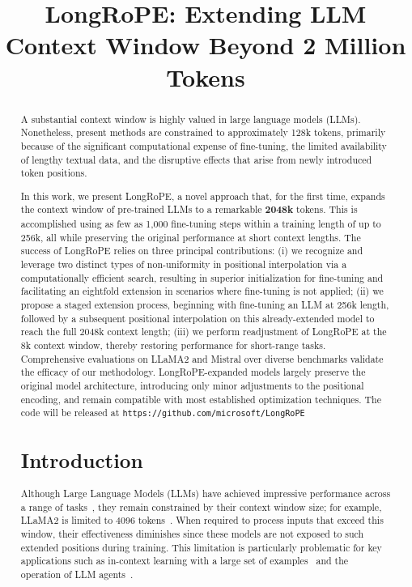 \title{LongRoPE: Extending LLM Context Window Beyond 2 Million Tokens}

\begin{abstract}
A substantial context window is highly valued in large language models (LLMs). Nonetheless, present methods are constrained to approximately 128k tokens, primarily because of the significant computational expense of fine-tuning, the limited availability of lengthy textual data, and the disruptive effects that arise from newly introduced token positions.

In this work, we present LongRoPE, a novel approach that, for the first time, expands the context window of pre-trained LLMs to a remarkable \textbf{2048k} tokens. This is accomplished using as few as 1,000 fine-tuning steps within a training length of up to 256k, all while preserving the original performance at short context lengths. The success of LongRoPE relies on three principal contributions: (i) we recognize and leverage two distinct types of non-uniformity in positional interpolation via a computationally efficient search, resulting in superior initialization for fine-tuning and facilitating an eightfold extension in scenarios where fine-tuning is not applied; (ii) we propose a staged extension process, beginning with fine-tuning an LLM at 256k length, followed by a subsequent positional interpolation on this already-extended model to reach the full 2048k context length; (iii) we perform readjustment of LongRoPE at the 8k context window, thereby restoring performance for short-range tasks. Comprehensive evaluations on LLaMA2 and Mistral over diverse benchmarks validate the efficacy of our methodology. LongRoPE-expanded models largely preserve the original model architecture, introducing only minor adjustments to the positional encoding, and remain compatible with most established optimization techniques. The code will be released at \texttt{https://github.com/microsoft/LongRoPE}

\section{Introduction}

Although Large Language Models (LLMs) have achieved impressive performance across a range of tasks~\cite{gpt4,llama2}, they remain constrained by their context window size; for example, LLaMA2 is limited to 4096 tokens~\cite{llama2}. When required to process inputs that exceed this window, their effectiveness diminishes since these models are not exposed to such extended positions during training. This limitation is particularly problematic for key applications such as in-context learning with a large set of examples~\cite{Huang2023FewerIM} and the operation of LLM agents~\cite{park2023generative,madaan2023selfrefine}.


\end{abstract}
